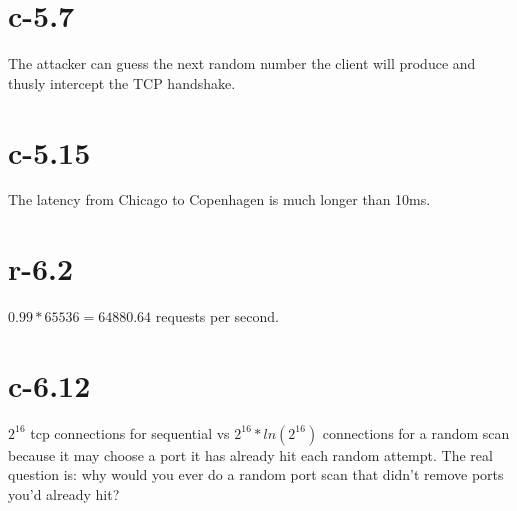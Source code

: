 \documentclass{amsart}
\begin{document}
  \section{c-5.7}
  The attacker can guess the next random number the client will produce and thusly intercept the TCP handshake.

  \section{c-5.15}
  The latency from Chicago to Copenhagen is much longer than 10ms.

  \section{r-6.2}
  $0.99 * 65536 = 64880.64$ requests per second.

  \section{c-6.12}
  $2^{16}$ tcp connections for sequential vs $2^{16}*ln(2^{16})$ connections for a random scan because it may choose a port it has already hit each random attempt. The real question is: why would you ever do a random port scan that didn't remove ports you'd already hit?
\end{document}
